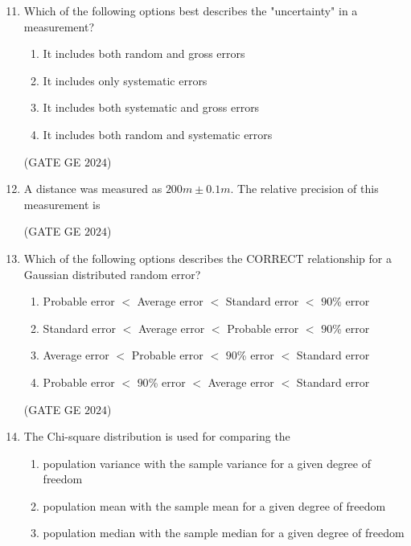 \documentclass[journal,12pt,onecolumn]{IEEEtran}
\theoremstyle{remark}
\begin{document}
\begin{enumerate}
\setcounter{enumi}{10}
\item Which of the following options best describes the "uncertainty" in a measurement?
\begin{enumerate}
\item It includes both random and gross errors
\item It includes only systematic errors
\item It includes both systematic and gross errors
\item It includes both random and systematic errors
\end{enumerate}
\hfill{(GATE GE $2024$)}
\bigskip

\item A distance was measured as $200 m \pm 0.1 m$.
The relative precision of this measurement is
\begin{enumerate}
\end{enumerate}
\hfill{(GATE GE $2024$)}
\bigskip
\item Which of the following options describes the CORRECT relationship for a Gaussian distributed random error?
\begin{enumerate}
\item Probable error $<$ Average error $<$ Standard error $<$ $90$\% error
\item Standard error $<$ Average error $<$ Probable error $<$ $90$\% error
\item Average error $<$ Probable error $<$ $90$\% error $<$ Standard error
\item Probable error $<$ $90$\% error $<$ Average error $<$ Standard error
\end{enumerate}
\hfill{(GATE GE $2024$)}
\bigskip
\item The Chi-square distribution is used for comparing the
\begin{enumerate}
\item population variance with the sample variance for a given degree of freedom
\item population mean with the sample mean for a given degree of freedom
\item population median with the sample median for a given degree of freedom

\end{enumerate}
\end{enumerate}
\end{document}
